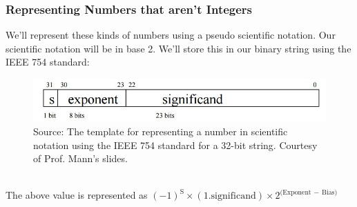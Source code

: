 \documentclass{report}
\begin{document}
\subsubsection{Representing Numbers that aren't Integers}
We'll represent these kinds of numbers using a pseudo scientific notation. Our scientific notation will be in base 2. We'll store this in our binary string using the IEEE 754 standard:
\begin{figure}[ht]
\begin{center}
\includegraphics[scale=0.65]{scientific_notation.jpg}
\end{center}
\caption{Source: The template for representing a number in scientific notation using the IEEE 754 standard for a 32-bit string. Courtesy of Prof. Mann's slides.}
\end{figure}\\
The above value is represented as $(-1)^\mathrm{S} \times (1.\mathrm{significand}) \times 2^{\mathrm{(Exponent}\,-\,\mathrm{Bias})}$
\end{document}
